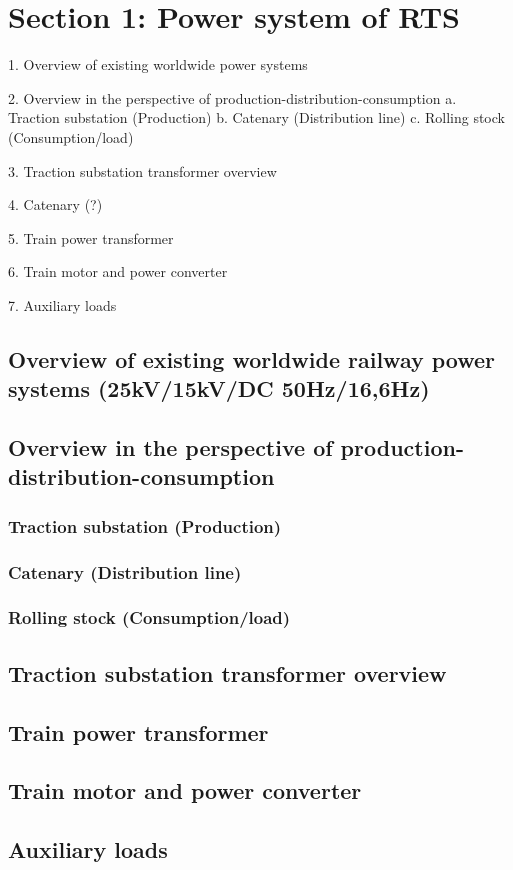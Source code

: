 




\section{Section 1: Power system of RTS}

1.	Overview of existing worldwide power systems

2.	Overview in the perspective of production-distribution-consumption
a.	Traction substation (Production)
b.	Catenary (Distribution line)
c.	Rolling stock (Consumption/load)

3.	Traction substation transformer overview

4.	Catenary (?)

5.	Train power transformer

6.	Train motor and power converter

7.	Auxiliary loads

\subsection{Overview of existing worldwide railway power systems (25kV/15kV/DC 50Hz/16,6Hz)}

\subsection{Overview in the perspective of production-distribution-consumption}


\subsubsection{Traction substation (Production)}

\subsubsection{Catenary (Distribution line)}

\subsubsection{Rolling stock (Consumption/load)}

\subsection{Traction substation transformer overview}

\subsection{Train power transformer}

\subsection{Train motor and power converter}

\subsection{Auxiliary loads}